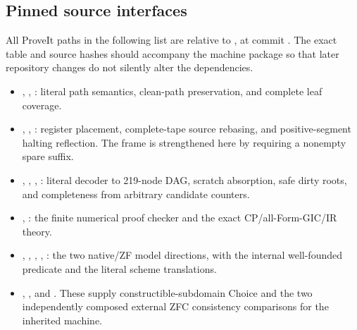 \subsection{Pinned source interfaces}

All ProveIt paths in the following list are relative to
, at
commit
\href{https://github.com/VladimirReshetnikov/ProveIt/tree/80e26b89e905bf3e5dfc322befdc1c6eaf25a109/Computability/BusyBeaver/Lean/BusyBeaver/ZFC}{}.
The exact table and source hashes should accompany the
machine package so that later repository changes do not
silently alter the dependencies.
\begin{itemize}
\item {},
,
: literal path semantics,
clean-path preservation, and complete leaf coverage.
\item {},
,
: register placement,
complete-tape source rebasing, and positive-segment
halting reflection.  The frame is strengthened here by
requiring a nonempty spare suffix.
\item {},
,
,
: literal decoder to
219-node DAG, scratch absorption, safe dirty roots,
and completeness from arbitrary candidate counters.
\item {},
: the finite numerical
proof checker and the exact CP/all-Form-GIC/IR theory.
\item {},
,
,
, :
the two native/ZF model directions, with the internal
well-founded predicate and the literal scheme translations.
\item {},
,
and .
These supply constructible-subdomain
Choice and the two independently composed external
ZFC consistency comparisons for the inherited machine.
\end{itemize}
